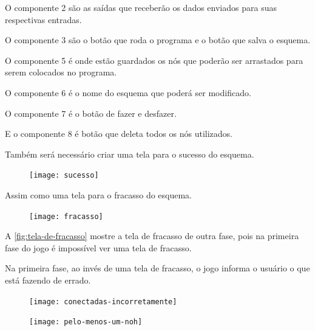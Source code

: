 \documentclass[12pt,oneside,a4paper,chapter=TITLE,section=TITLE,sumario
=tradicional]{abntex2}
\begin{document}
O componente 2 são as saídas que receberão os dados enviados para suas respectivas entradas.

O componente 3 são o botão que roda o programa e o botão que salva o esquema.

O componente 5 é onde estão guardados os nós que poderão ser arrastados para serem colocados no programa.

O componente 6 é o nome do esquema que poderá ser modificado.

O componente 7 é o botão de fazer e desfazer.

E o componente 8 é botão que deleta todos os nós utilizados.

\newpage

Também será necessário criar uma tela para o sucesso do esquema.

\begin{figure}[!h]
    \centering
    \texttt{[image: sucesso]}
\end{figure}

Assim como uma tela para o fracasso do esquema.

\begin{figure}[!h]
    \centering
    \texttt{[image: fracasso]}
\end{figure}

A \autoref{fig:tela-de-fracasso} mostre a tela de fracasso de outra fase, pois na primeira fase do jogo é impossível ver uma tela de fracasso.

\newpage

Na primeira fase, ao invés de uma tela de fracasso, o jogo informa o usuário o que está fazendo de errado.

\begin{figure}[!h]
    \centering
    \texttt{[image: conectadas-incorretamente]}
\end{figure}

\begin{figure}[!h]
    \centering
    \texttt{[image: pelo-menos-um-noh]}
\end{figure}
\end{document}
